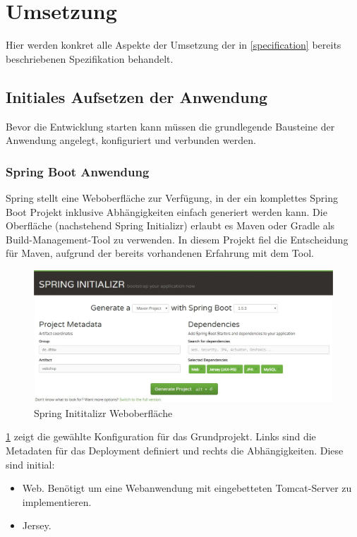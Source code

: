 \section{Umsetzung}
Hier werden konkret alle Aspekte der Umsetzung der in \cref{specification} bereits beschriebenen Spezifikation behandelt. %
 
\subsection{Initiales Aufsetzen der Anwendung}
Bevor die Entwicklung starten kann müssen die grundlegende Bausteine der Anwendung angelegt, konfiguriert und verbunden werden. 

\subsubsection{Spring Boot Anwendung}
Spring stellt eine Weboberfläche zur Verfügung, in der ein komplettes Spring Boot Projekt inklusive Abhängigkeiten einfach generiert werden kann. Die Oberfläche (nachstehend Spring Initializr) erlaubt es Maven oder Gradle als Build-Management-Tool zu verwenden. In diesem Projekt fiel die Entscheidung für Maven, aufgrund der bereits vorhandenen Erfahrung mit dem Tool. 

\begin{figure}[th!]
	\centering
	\includegraphics[width=\linewidth]{bilder/kap7/Spring-Initializr}
	\caption{Spring Inititalizr Weboberfläche\cite{}}
	\label{fig:spring-initializr}
\end{figure}

\cref{fig:spring-initializr} zeigt die gewählte Konfiguration für das Grundprojekt. Links sind die Metadaten für das Deployment definiert und rechts die Abhängigkeiten. Diese sind initial:
\begin{itemize}
	\item Web. Benötigt um eine Webanwendung mit eingebetteten Tomcat-Server zu implementieren.
	\item Jersey. 
\end{itemize}


